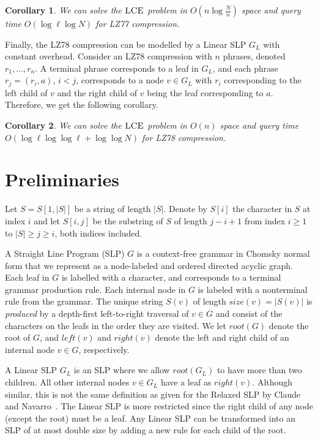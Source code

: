 \documentclass[11pt]{article}
\newtheorem{corollary}{Corollary}
\newcommand{\lceq}{\ensuremath{\textsc{LCE}}}
\newcommand{\size}{\ensuremath{\mathit{size}}}
\newcommand{\rootnode}{\ensuremath{\mathit{root}}}
\newcommand{\lchild}{\ensuremath{\mathit{left}}}
\newcommand{\rchild}{\ensuremath{\mathit{right}}}
\newcommand{\slp}{\ensuremath{G} }
\newcommand{\lslp}{\ensuremath{G_L} }
\begin{document}
\begin{corollary}
	We can solve the $\lceq$ problem in $O(n \log \frac{N}{n})$ space and query time $O(\log \ell \log N)$ for LZ77 compression.
\end{corollary}

\noindent Finally, the LZ78 compression can be modelled by a Linear SLP $\lslp$ with constant overhead. Consider an LZ78 compression with $n$ phrases, denoted $r_1, \ldots, r_n$. A terminal phrase corresponds to a leaf in $\lslp$, and each phrase $r_j = (r_i, a)$, $i < j$, corresponds to a node $v \in \lslp$ with $r_i$ corresponding to the left child of $v$ and the right child of $v$ being the leaf corresponding to $a$. Therefore, we get the following corollary.

\begin{corollary}
	We can solve the $\lceq$ problem in $O(n)$ space and query time $O(\log \ell \log \log \ell + \log \log N)$ for LZ78 compression.
\end{corollary}

\section{Preliminaries}
Let $S = S[1, |S|]$ be a string of length $|S|$. Denote by $S[i]$ the character in $S$ at index $i$ and let $S[i, j]$ be the substring of $S$ of length $j - i+1$ from index $i \geq 1$ to $|S| \geq j \geq i$, both indices included.

A Straight Line Program (SLP) $\slp$ is a context-free grammar in Chomsky normal form that we represent as a node-labeled and ordered directed acyclic graph. Each leaf in $\slp$ is labelled with a character, and corresponds to a terminal grammar production rule. Each internal node in $\slp$ is labeled with a nonterminal rule from the grammar. The unique string $S(v)$ of length $\size(v) = |S(v)|$ is \emph{produced} by a depth-first left-to-right traversal of $v \in \slp$ and consist of the characters on the leafs in the order they are visited. We let $\rootnode(\slp)$ denote the root of $\slp$, and $\lchild(v)$ and $\rchild(v)$ denote the left and right child of an internal node $v \in \slp$, respectively.

A Linear SLP $\lslp$ is an SLP where we allow $\rootnode(\lslp)$ to have more than two children. All other internal nodes $v \in \lslp$ have a leaf as $\rchild(v)$. Although similar, this is not the same definition as given for the Relaxed SLP by Claude and Navarro~\cite{claude2011self}. The Linear SLP is more restricted since the right child of any node (except the root) must be a leaf. Any Linear SLP can be transformed into an SLP of at most double size by adding a new rule for each child of the root.
\end{document}
